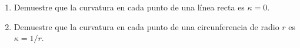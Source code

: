 \item 
    \begin{enumerate}
        \item[(a)] Demuestre que la curvatura en cada punto de una línea recta es $\kappa = 0$.
        \item[(b)] Demuestre que la curvatura en cada punto de una circunferencia de radio $r$ es $\kappa = 1/r$.
    \end{enumerate}
